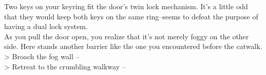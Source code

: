 Two keys on your keyring fit the door’s twin lock mechanism. It’s a little odd that they would keep both keys on the same ring--seems to defeat the purpose of having a dual lock system.\\

As you pull the door open, you realize that it’s not merely foggy on the other side. Here stands another barrier like the one you encountered before the catwalk.\\

> Broach the fog wall -- \\
> Retreat to the crumbling walkway -- 